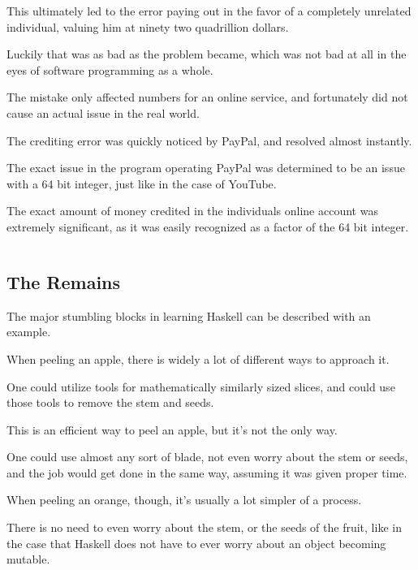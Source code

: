 \documentclass{article}
\begin{document}
\medskip\noindent
This ultimately led to the error paying out in the favor of a completely unrelated individual, valuing him at ninety two quadrillion dollars.

\medskip\noindent
Luckily that was as bad as the problem became, which was not bad at all in the eyes of software programming as a whole. 

\medskip\noindent
The mistake only affected numbers for an online service, and fortunately did not cause an actual issue in the real world. 

\medskip\noindent
The crediting error was quickly noticed by PayPal, and resolved almost instantly.

\medskip\noindent
The exact issue in the program operating PayPal was determined to be an issue with a 64 bit integer, just like in the case of YouTube. 

\medskip\noindent
The exact amount of money credited in the individuals online account was extremely significant, as it was easily recognized as a factor of the 64 bit integer.

\medskip\medskip
\begin{lstlisting}
\end{lstlisting}
\subsection{The Remains}
\medskip\medskip
\hspace{\parindent} 

The major stumbling blocks in learning Haskell can be described with an example. 

\medskip\noindent
When peeling an apple, there is widely a lot of different ways to approach it. 

\medskip\noindent
One could utilize tools for mathematically similarly sized slices, and could use those tools to remove the stem and seeds. 

\medskip\noindent
This is an efficient way to peel an apple, but it's not the only way.  

\medskip\noindent
One could use almost any sort of blade, not even worry about the stem or seeds, and the job would get done in the same way, assuming it was given proper time.

\medskip\noindent
When peeling an orange, though, it's usually a lot simpler of a process. 

\medskip\noindent
There is no need to even worry about the stem, or the seeds of the fruit, like in the case that Haskell does not have to ever worry about an object becoming mutable. 
\end{document}
